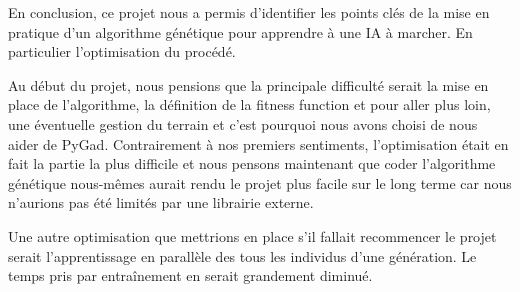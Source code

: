 \documentclass[journal, a4paper]{IEEEtran}
\begin{document}
En conclusion, ce projet nous a permis d'identifier les points clés de la mise en pratique d'un algorithme génétique pour apprendre à une IA à marcher. En particulier l'optimisation du procédé. 

Au début du projet, nous pensions que la principale difficulté serait la mise en place de l'algorithme, la définition de la fitness function et pour aller plus loin, une éventuelle gestion du terrain et c'est pourquoi nous avons choisi de nous aider de PyGad. Contrairement à nos premiers sentiments, l'optimisation était en fait la partie la plus difficile et nous pensons maintenant que coder l'algorithme génétique nous-mêmes aurait rendu le projet plus facile sur le long terme car nous n'aurions pas été limités par une librairie externe.

Une autre optimisation que mettrions en place s'il fallait recommencer le projet serait l'apprentissage en parallèle des tous les individus d'une génération. Le temps pris par entraînement en serait grandement diminué.





		



\end{document}
